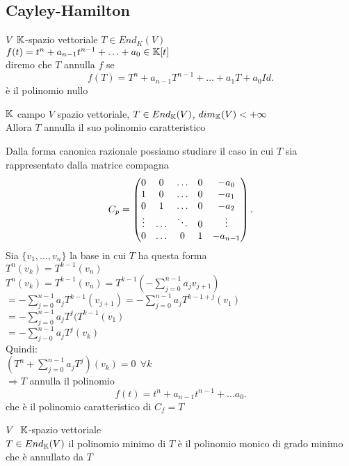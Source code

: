 \documentclass[12px]{article}
\begin{document}
\subsection{Cayley-Hamilton}
\begin{defi}
	$V\ \mathbb{K}$-spazio vettoriale $T\in End_K(V)$\\
	$f(t) = t^n + a_{n-1}t^{n-1} + \ldots + a_0\in\mathbb{K}[t]$\\
	diremo che $T$ annulla $f$ se\\
	\[
		f(T) = T^n + a_{n-1}T^{n-1}+\ldots+a_1T + a_0 Id
	.\]
	è il polinomio nullo
\end{defi}
\begin{teo}
	$\mathbb{K}$ campo $V$ spazio vettoriale, $T\in End_{\mathbb{K}}(V)$,  $dim_{\mathbb{K}}(V)< +\infty$\\
	Allora  $T$ annulla il suo polinomio caratteristico
\end{teo}
\begin{dimo}
	Dalla forma canonica razionale possiamo studiare il caso in cui $T$ sia rappresentato dalla matrice compagna
	 \[
		 C_p = \begin{pmatrix}0 & 0 & \ldots & 0 & -a_0\\
			 1 & 0 & \ldots  & 0 & -a_1\\
			 0 & 1 & \ldots & 0& -a_2\\
			 \vdots & \ldots & \ddots & 0 & \vdots\\
0 & \ldots & 0 &1 & -a_{n-1}\end{pmatrix}
	.\] 
	Sia $\{v_1,\ldots,v_n\}$ la base in cui $T$ ha questa forma\\
	$T^n(v_k) = T^{k-1}(v_n)$\\
	$T^n (v_k) = T^{k-1}(v_n) = T^{k-1}(- \sum^{n-1}_{j=0}a_jv_{j+1})$\\
$ = - \sum^{n-1}_{j=0}a_j T^{k-1}(v_{j+1}) = -\sum^{n-1}_{j=0}a_j T^{k -1 + j}(v_1)$\\
$ = - \sum^{n-1}_{j=0}a_jT^j(T^{k-1}(v_1)$\\
$ = - \sum^{n-1}_{j-0}a_jT^j(v_k)$\\
Quindi:\\
$(T^n + \sum^{n-1}_{j=0}a_jT^j)(v_k) = 0\ \ \forall k$ \\
$ \Rightarrow  T$ annulla il polinomio
\[
	f(t) = t^n + a_{n-1}t^{n-1}+ \ldots a_0
.\]  che è il polinomio caratteristico di $C_f = T$
\end{dimo}
\begin{defi}
	$V\ \ \mathbb{K}$-spazio vettoriale\\
	 $T \in End_{\mathbb{K}}(V)$ il polinomio minimo di  $T$ è il polinomio monico di grado minimo che è annullato da $T$
\end{defi}
\end{document}
